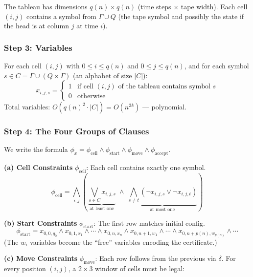 \documentclass[12pt,a4paper]{article}
\begin{document}
The tableau has dimensions $q(n) \times q(n)$ (time steps $\times$ tape width).
Each cell $(i,j)$ contains a symbol from $\Gamma \cup Q$ (the tape symbol and possibly the state if the head is at column $j$ at time $i$).

\subsubsection{Step 3: Variables}

For each cell $(i,j)$ with $0 \leq i \leq q(n)$ and $0 \leq j \leq q(n)$, 
and for each symbol $s \in C = \Gamma \cup (Q \times \Gamma)$ (an alphabet of size $|C|$):
\[
  x_{i,j,s} = 
  \begin{cases} 
    1 & \text{if cell $(i,j)$ of the tableau contains symbol $s$} \\
    0 & \text{otherwise}
  \end{cases}
\]
Total variables: $O(q(n)^2 \cdot |C|) = O(n^{2k})$ --- polynomial.

\subsubsection{Step 4: The Four Groups of Clauses}

We write the formula $\phi_x = \phi_{\text{cell}} \land \phi_{\text{start}} \land \phi_{\text{move}} \land \phi_{\text{accept}}$.

\medskip
\noindent\textbf{(a) Cell Constraints} $\phi_{\text{cell}}$: Each cell contains exactly one symbol.
\[
  \phi_{\text{cell}} = \bigwedge_{i,j} \left( 
    \underbrace{\bigvee_{s \in C} x_{i,j,s}}_{\text{at least one}} 
    \;\land\; 
    \underbrace{\bigwedge_{s \neq t} (\neg x_{i,j,s} \lor \neg x_{i,j,t})}_{\text{at most one}}
  \right)
\]

\medskip
\noindent\textbf{(b) Start Constraints} $\phi_{\text{start}}$: The first row matches initial config.
\[
  \phi_{\text{start}} = x_{0,0,q_0} \land x_{0,1,x_1} \land \cdots \land x_{0,n,x_n} \land 
  x_{0,n+1,w_1} \land \cdots \land x_{0,n+p(n),w_{p(n)}} \land \cdots
\]
(The $w_i$ variables become the ``free'' variables encoding the certificate.)

\medskip
\noindent\textbf{(c) Move Constraints} $\phi_{\text{move}}$: Each row follows from the previous via $\delta$.
For every position $(i,j)$, a $2 \times 3$ window of cells must be legal:
\end{document}
